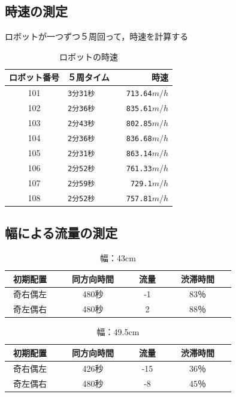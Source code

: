 \documentclass[twocolumn]{jarticle} %
\begin{document}
\subsection{時速の測定}
ロボットが一つずつ５周回って，時速を計算する
\begin{table}[!ht]
\begin{center}
\begin{tabular}{|c|l|r|}
\hline
ロボット番号 &  ５周タイム　&　時速　\\
\hline
101 & \verb|3分31秒|  &  \verb|713.64|$m/h$ \\
102 & \verb|2分36秒|  &  \verb|835.61|$m/h$ \\
103 & \verb|2分43秒|  &  \verb|802.85|$m/h$ \\
104 & \verb|2分36秒|  &  \verb|836.68|$m/h$ \\
105 & \verb|2分31秒|  &  \verb|863.14|$m/h$ \\
106 & \verb|2分52秒|  &  \verb|761.33|$m/h$ \\
107 & \verb|2分59秒|  &  \verb|729.1|$m/h$ \\
108 & \verb|2分52秒|  &  \verb|757.81|$m/h$ \\
\hline
\end{tabular}
\end{center}
\caption{
ロボットの時速
}
\end{table}


\subsection{幅による流量の測定}

\begin{table}[!ht]
\begin{center}
\begin{tabular}{|c|c|c|c|c|}
\hline
初期配置　&　同方向時間　&　流量　&　渋滞時間　\\
\hline
奇右偶左　&　480秒　&　-1　&　83％ \\
\hline
奇左偶右　&　480秒　&　2　&　88％ \\
\hline
\end{tabular}
\end{center}
\caption{
幅：43cm
}
\end{table}

\begin{table}[!ht]
\begin{center}
\begin{tabular}{|c|c|c|c|c|}
\hline
初期配置　&　同方向時間　&　流量　&　渋滞時間　\\
\hline
奇右偶左　&　426秒　&　-15　&　36％ \\
\hline
奇左偶右　&　480秒　&　-8　&　45％ \\
\hline
\end{tabular}
\end{center}
\caption{
幅：49.5cm
}
\end{table}
\end{document}

